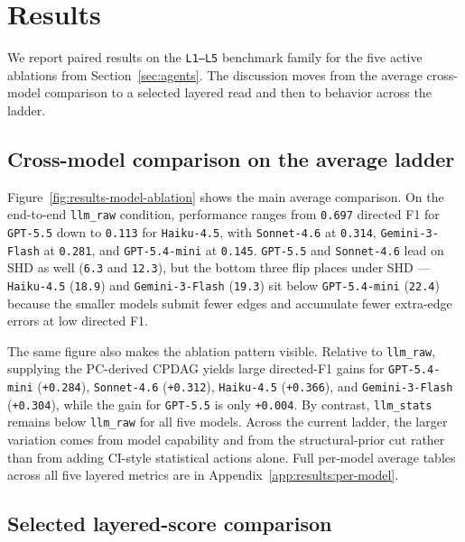 \section{Results}
\label{sec:results}

We report paired results on the \texttt{L1--L5} benchmark family for the five active ablations from Section~\ref{sec:agents}. The discussion moves from the average cross-model comparison to a selected layered read and then to behavior across the ladder.

\subsection{Cross-model comparison on the average ladder}

Figure~\ref{fig:results-model-ablation} shows the main average comparison. On the end-to-end \texttt{llm\_raw} condition, performance ranges from \texttt{0.697} directed F1 for \texttt{GPT-5.5} down to \texttt{0.113} for \texttt{Haiku-4.5}, with \texttt{Sonnet-4.6} at \texttt{0.314}, \texttt{Gemini-3-Flash} at \texttt{0.281}, and \texttt{GPT-5.4-mini} at \texttt{0.145}. \texttt{GPT-5.5} and \texttt{Sonnet-4.6} lead on SHD as well (\texttt{6.3} and \texttt{12.3}), but the bottom three flip places under SHD --- \texttt{Haiku-4.5} (\texttt{18.9}) and \texttt{Gemini-3-Flash} (\texttt{19.3}) sit below \texttt{GPT-5.4-mini} (\texttt{22.4}) because the smaller models submit fewer edges and accumulate fewer extra-edge errors at low directed F1.



The same figure also makes the ablation pattern visible. Relative to \texttt{llm\_raw}, supplying the PC-derived CPDAG yields large directed-F1 gains for \texttt{GPT-5.4-mini} (\texttt{+0.284}), \texttt{Sonnet-4.6} (\texttt{+0.312}), \texttt{Haiku-4.5} (\texttt{+0.366}), and \texttt{Gemini-3-Flash} (\texttt{+0.304}), while the gain for \texttt{GPT-5.5} is only \texttt{+0.004}. By contrast, \texttt{llm\_stats} remains below \texttt{llm\_raw} for all five models. Across the current ladder, the larger variation comes from model capability and from the structural-prior cut rather than from adding CI-style statistical actions alone. Full per-model average tables across all five layered metrics are in Appendix~\ref{app:results:per-model}.

\subsection{Selected layered-score comparison}

